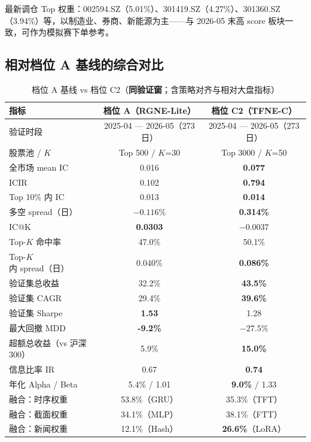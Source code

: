 \documentclass[UTF8,a4paper,12pt]{ctexart}
\begin{document}
最新调仓 Top 权重：002594.SZ（5.01\%）、301419.SZ（4.27\%）、301360.SZ（3.94\%）等，以制造业、券商、新能源为主——与 2026-05 末高 score 板块一致，可作为模拟赛下单参考。

\subsection{相对档位 A 基线的综合对比}

\begin{table}[H]
\centering
\caption{档位 A 基线 vs 档位 C2（\textbf{同验证窗}；含策略对齐与相对大盘指标）}
\label{tab:cmp-a}
\begin{tabular}{lcc}
\toprule
\textbf{指标} & \textbf{档位 A（RGNE-Lite）} & \textbf{档位 C2（TFNE-C）} \\
\midrule
验证时段 & 2025-04 --- 2026-05（273 日） & 2025-04 --- 2026-05（273 日） \\
股票池 / $K$ & Top 500 / $K$=30 & Top 3000 / $K$=50 \\
\midrule
全市场 mean IC & 0.016 & \textbf{0.077} \\
ICIR & 0.102 & \textbf{0.794} \\
Top 10\% 内 IC & 0.013 & \textbf{0.014} \\
多空 spread（日） & $-0.116\%$ & \textbf{0.314\%} \\
IC@K & \textbf{0.0303} & $-0.0037$ \\
Top-$K$ 命中率 & 47.0\% & 50.1\% \\
Top-$K$ 内 spread（日） & 0.040\% & \textbf{0.086\%} \\
\midrule
验证集总收益 & 32.2\% & \textbf{43.5\%} \\
验证集 CAGR & 29.4\% & \textbf{39.6\%} \\
验证集 Sharpe & \textbf{1.53} & 1.28 \\
最大回撤 MDD & \textbf{-9.2\%} & $-27.5\%$ \\
超额总收益（vs 沪深300） & 5.9\% & \textbf{15.0\%} \\
信息比率 IR & 0.67 & \textbf{0.74} \\
年化 Alpha / Beta & 5.4\% / 1.01 & \textbf{9.0\%} / 1.33 \\
\midrule
融合：时序权重 & 53.8\%（GRU） & 35.3\%（TFT） \\
融合：截面权重 & 34.1\%（MLP） & 38.1\%（FTT） \\
融合：新闻权重 & 12.1\%（Hash） & \textbf{26.6\%}（LoRA） \\
\bottomrule
\end{tabular}
\end{table}
\end{document}
